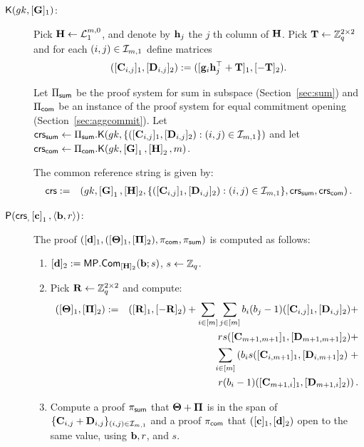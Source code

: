 \begin{description}
\item[{$\mathsf{K}({gk}, [\mathbf{{G}}]_1)$}:] 
Pick $\mathbf{{H}}\gets\mathcal{L}_1^{m,0}$, and denote by $\mathbf{h}_{j}$ the $j$ th column of $\mathbf{{H}}$. Pick $\mathbf{{T}}\gets\mathbb{Z}_q^{2\times 2}$ and for each $(i,j)\in\mathcal{I}_{m,1}$ define matrices
$$([\mathbf{{C}}_{i,j}]_1,[\mathbf{{D}}_{i,j}]_2):=([\mathbf{g}_i\mathbf{h}_j^{\top}+\mathbf{{T}}]_1,[-\mathbf{{T}}]_2).$$

Let $\Pi_{\mathsf{sum}}$ be the proof system for sum in subspace 
(Section~\ref{sec:sum}) and $\Pi_{\mathsf{com}}$
be an instance of the proof system for equal commitment opening (Section~\ref{sec:aggcommit}).
Let
$\mathsf{crs}_{\mathsf{sum}} \gets \Pi_{\mathsf{sum}}.\mathsf{K}({gk}, \{([\mathbf{{C}}_{i,j}]_1,[\mathbf{{D}}_{i,j}]_2):(i,j)\in\mathcal{I}_{m,1}\})$ and let $\mathsf{crs}_{\mathsf{com}} \gets \Pi_{\mathsf{com}}.\mathsf{K}({gk}, \left[\mathbf{{G}}\right]_1,\left[\mathbf{{H}}\right]_2,m)$. 

The common reference string is given by:
\begin{eqnarray*}
\mathsf{crs}&:=&\left( gk, \left[\mathbf{{G}}\right]_1,
    [\mathbf{{H}}]_2, \{([\mathbf{{C}}_{i,j}]_1, [\mathbf{{D}}_{i,j}]_2): (i,j) \in \mathcal{I}_{m,1}\},\mathsf{crs}_{\mathsf{sum}},\mathsf{crs}_{\mathsf{com}} \right).
 \end{eqnarray*}
\item[$\mathsf{P}(\mathsf{crs}_, \left[\mathbf{c}\right]_1, \langle \mathbf{b}, r \rangle)$:] The proof $([\mathbf{d}]_1,([\mathbf{{\Theta}}]_1,[\mathbf{{\Pi}}]_2),\pi_{\mathsf{com}},\pi_{\mathsf{sum}})$ is computed as follows:
\begin{enumerate}
\item $[\mathbf{d}]_2:= \mathsf{MP}.\mathsf{Com}_{[\mathbf{{H}}]_2} (\mathbf{b};s)$, $s \gets \mathbb{Z}_q$. 
\item Pick $\mathbf{{R}} \gets \mathbb{Z}_q^{2\times 2}$ and compute:
\begin{eqnarray*}
([\mathbf{{\Theta}}]_1, [\mathbf{{\Pi}}]_2) & := & ([\mathbf{{R}}]_1,[-\mathbf{{R}}]_2)+
\sum_{i\in[m]}\sum_{j\in[m]}b_i(b_j-1)([\mathbf{{C}}_{i,j}]_1,[\mathbf{{D}}_{i,j}]_2)+\\
& &     rs([\mathbf{{C}}_{m+1,m+1}]_1,[\mathbf{{D}}_{m+1,m+1}]_2)+\\
& &
  \sum_{i \in [m]}
 \left(b_i s  ([\mathbf{{C}}_{i,m+1}]_1,[\mathbf{{D}}_{i,m+1}]_2)\right. +\\
& & \left.r(b_i-1) ([\mathbf{{C}}_{m+1,i}]_1,[\mathbf{{D}}_{m+1,i}]_2)\right).
\end{eqnarray*}

\item Compute a proof $\pi_{\mathsf{sum}}$
that $\mathbf{{\Theta}}+\mathbf{{\Pi}}$ is in the span of 
$\{\mathbf{{C}}_{i,j}+\mathbf{{D}}_{i,j}\}_{(i,j)\in\mathcal{I}_{m,1}}$
and a proof $\pi_{\mathsf{com}}$
that
$([\mathbf{c}]_1,[\mathbf{d}]_2)$ open to the same value,
using $\mathbf{b},r$, and $s$. \\
\end{enumerate}


\end{description}
